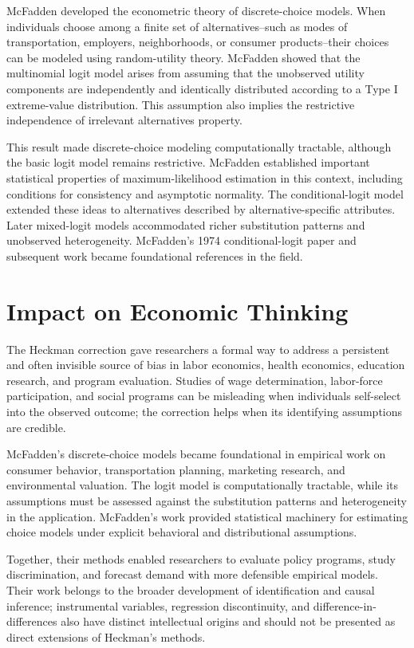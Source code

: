 McFadden developed the econometric theory of discrete-choice models. When
individuals choose among a finite set of alternatives--such as modes of
transportation, employers, neighborhoods, or consumer products--their choices
can be modeled using random-utility theory. McFadden showed that the multinomial
logit model arises from assuming that the unobserved utility components are
independently and identically distributed according to a Type I extreme-value
distribution. This assumption also implies the restrictive independence of
irrelevant alternatives property.

This result made discrete-choice modeling computationally tractable, although the
basic logit model remains restrictive. McFadden established important statistical
properties of maximum-likelihood estimation in this context, including conditions
for consistency and asymptotic normality. The conditional-logit model extended
these ideas to alternatives described by alternative-specific attributes. Later
mixed-logit models accommodated richer substitution patterns and unobserved
heterogeneity. McFadden's 1974 conditional-logit paper and subsequent work became
foundational references in the field.

\section{Impact on Economic Thinking}
The Heckman correction gave researchers a formal way to address a persistent and
often invisible source of bias in labor economics, health economics, education
research, and program evaluation. Studies of wage determination, labor-force
participation, and social programs can be misleading when individuals self-select
into the observed outcome; the correction helps when its identifying assumptions
are credible.

McFadden's discrete-choice models became foundational in empirical work on
consumer behavior, transportation planning, marketing research, and
environmental valuation. The logit model is computationally tractable, while
its assumptions must be assessed against the substitution patterns and
heterogeneity in the application. McFadden's work provided statistical machinery
for estimating choice models under explicit behavioral and distributional
assumptions.

Together, their methods enabled researchers to evaluate policy programs, study
discrimination, and forecast demand with more defensible empirical models. Their
work belongs to the broader development of identification and causal inference;
instrumental variables, regression discontinuity, and difference-in-differences
also have distinct intellectual origins and should not be presented as direct
extensions of Heckman's methods.

